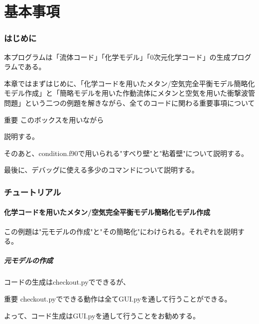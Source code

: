 \documentclass{jsarticle}
\begin{document}
%
%
%

\part{基本事項}
\newpage
\section{はじめに}
本プログラムは「流体コード」「化学モデル」「0次元化学コード」の生成プログラムである。

本章ではまずはじめに、「化学コードを用いたメタン/空気完全平衡モデル簡略化モデル作成」と「簡略モデルを用いた作動流体にメタンと空気を用いた衝撃波管問題」という二つの例題を解きながら、全てのコードに関わる重要事項について
\begin{itembox}[l]{重要}
このボックスを用いながら
\end{itembox}
説明する。

そのあと、condition.f90で用いられる"すべり壁"と"粘着壁"について説明する。

最後に、デバッグに使える多少のコマンドについて説明する。

\newpage

\section{チュートリアル}
\subsection{化学コードを用いたメタン/空気完全平衡モデル簡略化モデル作成}%
この例題は"元モデルの作成"と"その簡略化"にわけられる。それぞれを説明する。
\subsubsection{元モデルの作成}
コードの生成はcheckout.pyでできるが、
\begin{itembox}[l]{重要}
checkout.pyでできる動作は全てGUI.pyを通して行うことができる。
\end{itembox}
よって、コード生成はGUI.pyを通して行うことをお勧めする。
\end{document}
